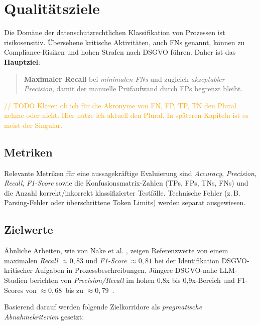 \section{Qualitätsziele}\label{sec:qualitatsziele}

Die Domäne der datenschutzrechtlichen Klassifikation von Prozessen ist risikosensitiv. Übersehene kritische Aktivitäten, auch \acp{FN} genannt, können zu Compliance-Risiken und hohen Strafen nach \ac{DSGVO} führen. Daher ist das \textbf{Hauptziel}:

\begin{quote}
    \textbf{Maximaler Recall} bei \emph{minimalen \acp{FN}} und zugleich \emph{akzeptabler Precision}, damit der manuelle Prüfaufwand durch \acp{FP} begrenzt bleibt.
\end{quote}

\textcolor{orange}{// TODO Klären ob ich für die Akronyme von FN, FP, TP, TN den Plural nehme oder nicht. Hier nutze ich aktuell den Plural. In späteren Kapiteln ist es meist der Singular.}

\subsection*{Metriken}

Relevante Metriken für eine aussagekräftige Evaluierung sind \emph{Accuracy}, \emph{Precision}, \emph{Recall}, \emph{F1-Score} sowie die Konfusionsmatrix-Zahlen (\acp{TP}, \acp{FP}, \acp{TN}, \acp{FN}) und die Anzahl korrekt/inkorrekt klassifizierter Testfälle. Technische Fehler (z.\,B. Parsing-Fehler oder überschrittene Token Limits) werden separat ausgewiesen.

\subsection*{Zielwerte}

Ähnliche Arbeiten, wie von Nake et al. \cite{nake2023towards}, zeigen Referenzwerte von einem maximalen \emph{Recall} $\approx 0{,}83$ und \emph{F1-Score} $\approx 0{,}81$ bei der Identifikation \ac{DSGVO}-kritischer Aufgaben in Prozessbeschreibungen. Jüngere \ac{DSGVO}-nahe \ac{LLM}-Studien berichten von \emph{Precision/Recall} im hohen 0{,}8x bis 0{,}9x-Bereich \cite{hooda2024policylr} und F1-Scores von $\approx 0{,}68$~bis zu $\approx 0{,}79$~\cite{schwerin2024systematic}.

Basierend darauf werden folgende Zielkorridore als \emph{pragmatische Abnahmekriterien} gesetzt:

